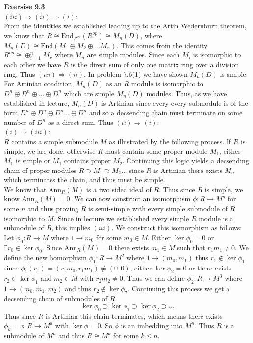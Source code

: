 \documentclass[12pt]{article}
\newenvironment{ques}[1]{\textbf{Exersise #1}\vspace{1 mm}\\ }{\bigskip}
\theoremstyle{definition}
\newcommand{\End}{\text{End}}
\begin{document}
\begin{ques}{9.3}
	$(iii) \Rightarrow (ii) \Rightarrow (i)$:\\
	From the identities we established leading up to the Artin Wedernburn
	theorem, we know that $R \cong \End_{R^{op}}(R^{op}) \cong M_{n}(D)$, where
	$M_n(D) \cong \End(M_1 \oplus M_2 \oplus \dots M_n)$. This comes from the
	identity $R^{op} \cong \oplus_{i=1}^n M_n$ where $M_n$ are simple modules.
	Since each $M_i$ is isomorphic to each other we have $R$ is the direct
	sum of only one matrix ring over a division ring. Thus $(iii) \Rightarrow
	(ii)$. In problem 7.6(1) we have shown $M_n(D)$ is simple. For Artinian
	condition, $M_n(D)$ as an $R$ module is isomorphic to $D^n \oplus D^n
	\oplus \dots \oplus D^n$ which are simple $M_n(D)$ modules. Thus, as we
	have established in lecture,
	$M_n(D)$ is Artinian since every every submodule is of the form $D^n \oplus
	D^n \oplus D^n \dots \oplus D^n$ and so a decsending chain must terminate
	on some number of $D^n$ as a direct sum.
	Thus $(ii) \Rightarrow (i)$.\\
	$(i) \Rightarrow (iii)$:\\
	$R$ contains a simple submodule $M$ as illustrated by the following
	process. If $R$ is simple, we are done, otherwise $R$ must contain some
	proper module $M_1$, either $M_1$ is simple or $M_1$ contains proper $M_2$.
	Continuing this logic yields a decsending chain of proper modules $R
	\supset M_1 \supset M_2 \dots$ since $R$ is Artinian there exists
	$M_n$ which terminates the chain, and thus must be simple.\\
	We know that Ann$_R(M)$ is a two sided ideal of $R$. Thus since $R$ is
	simple, we know Ann$_R(M) = 0$. We can now construct an isomorphism $\phi:R
	\to M^n$ for some $n$ and thus proving $R$ is semi-simple with every simple
	submodule of $R$ isomorphic to $M$. Since in lecture we established every
	simple $R$ module is a submodule of $R$, this implies $(iii)$. We
	construct this isomorphism as follows:\\
	Let $\phi_0:R \to M$ where $1 \to m_0$ for some $m_0 \in M$. Either $\ker
	\phi_0 = 0$ or $\exists r_0 \in \ker \phi_0$. Since Ann$_R(M)= 0$ there
	exists $m_1 \in M$ such that $r_1m_1 \neq 0$. We define the new homorphism
	$\phi_1:R \to M^2$ where $1 \to (m_0, m_1)$ thus $r_1 \notin \ker \phi_1$
	since $\phi_1(r_1) = (r_1m_0,r_1m_1) \neq (0,0)$, either $\ker \phi_2 = 0$ or
	there exists $r_2 \in \ker \phi_1$ and $m_2 \in M$ with $r_2m_2 \neq 0$.
	Thus we can define $\phi_2 : R \to M^3$ where $1 \to (m_0,m_1,m_2)$ and
	thus $r_2 \notin \ker \phi_2$. Continuing this process we get a decsending
	chain of submodules of $R$
	$$\ker \phi_0 \supset \ker \phi_1 \supset \ker \phi_2 \supset \dots $$
	Thus since $R$ is Artinian this chain terminates, which means there exists
	$\phi_k = \phi:R \to M^n$ with $\ker \phi = 0$. So $\phi$ is an imbedding
	into $M^n$. Thus $R$ is a submodule of $M^n$ and thus $R \cong M^k$ for
	some $k \leq n$.


\end{ques}
\end{document}
